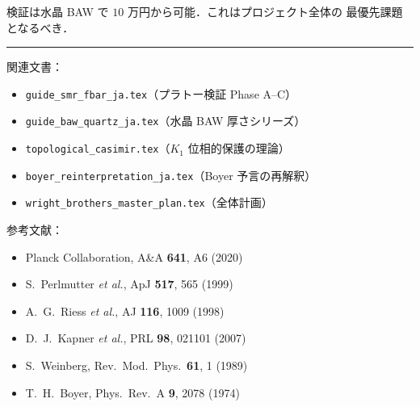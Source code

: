 \documentclass[11pt,a4paper]{article}
\begin{document}
検証は水晶 BAW で $10$ 万円から可能．これはプロジェクト全体の
最優先課題となるべき．

\vspace{1em}
\hrule
\vspace{0.5em}
\small
\noindent
関連文書：
\begin{itemize}
\item \texttt{guide\_smr\_fbar\_ja.tex}（プラトー検証 Phase A--C）
\item \texttt{guide\_baw\_quartz\_ja.tex}（水晶 BAW 厚さシリーズ）
\item \texttt{topological\_casimir.tex}（$K_1$ 位相的保護の理論）
\item \texttt{boyer\_reinterpretation\_ja.tex}（Boyer 予言の再解釈）
\item \texttt{wright\_brothers\_master\_plan.tex}（全体計画）
\end{itemize}

\vspace{0.5em}
\noindent
参考文献：
\begin{itemize}
\item Planck Collaboration, A\&A \textbf{641}, A6 (2020)
\item S.~Perlmutter \textit{et al.}, ApJ \textbf{517}, 565 (1999)
\item A.~G.~Riess \textit{et al.}, AJ \textbf{116}, 1009 (1998)
\item D.~J.~Kapner \textit{et al.}, PRL \textbf{98}, 021101 (2007)
\item S.~Weinberg, Rev.\ Mod.\ Phys.\ \textbf{61}, 1 (1989)
\item T.~H.~Boyer, Phys.\ Rev.\ A \textbf{9}, 2078 (1974)
\end{itemize}
\end{document}
